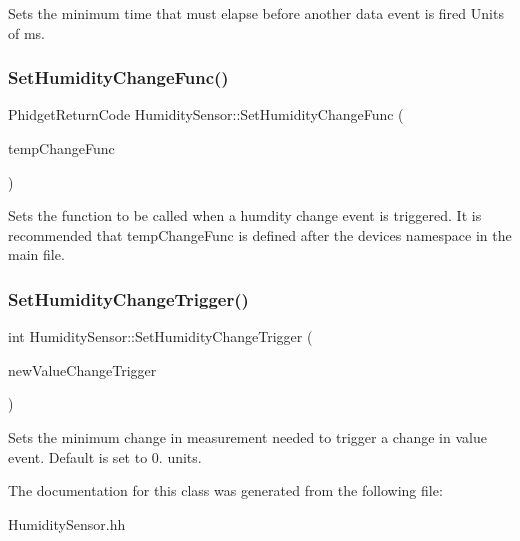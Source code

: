 Sets the minimum time that must elapse before another data event is fired Units of ms.\mbox{\label{classHumiditySensor_a8ceff441668925dab38fecb150879160}} 
\subsubsection{\texorpdfstring{Set\+Humidity\+Change\+Func()}{SetHumidityChangeFunc()}}
{\footnotesize\ttfamily Phidget\+Return\+Code Humidity\+Sensor\+::\+Set\+Humidity\+Change\+Func (\begin{DoxyParamCaption}\item[{Phidget\+Humidity\+Sensor\+\_\+\+On\+Humidity\+Change\+Callback}]{temp\+Change\+Func }\end{DoxyParamCaption})\hspace{0.3cm}{\ttfamily [inline]}}

Sets the function to be called when a humdity change event is triggered. It is recommended that temp\+Change\+Func is defined after the devices namespace in the main file.\mbox{\label{classHumiditySensor_aedd8316be052bfbda8b882b61ad46a0b}} 
\subsubsection{\texorpdfstring{Set\+Humidity\+Change\+Trigger()}{SetHumidityChangeTrigger()}}
{\footnotesize\ttfamily int Humidity\+Sensor\+::\+Set\+Humidity\+Change\+Trigger (\begin{DoxyParamCaption}\item[{double}]{new\+Value\+Change\+Trigger }\end{DoxyParamCaption})\hspace{0.3cm}{\ttfamily [inline]}}

Sets the minimum change in measurement needed to trigger a change in value event. Default is set to 0. units.

The documentation for this class was generated from the following file\+:\begin{DoxyCompactItemize}
\item 
Humidity\+Sensor.\+hh\end{DoxyCompactItemize}
